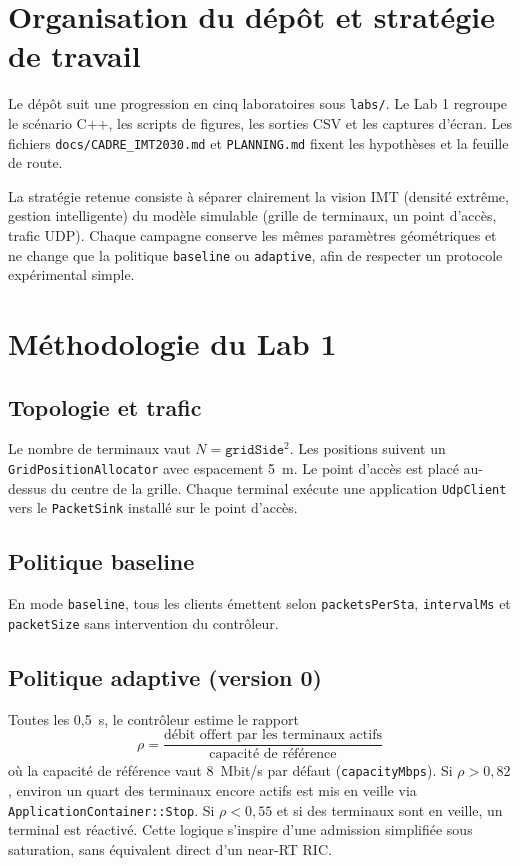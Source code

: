\documentclass[11pt,a4paper]{article}
\begin{document}
\section{Organisation du dépôt et stratégie de travail}

Le dépôt suit une progression en cinq laboratoires sous \texttt{labs/}. Le Lab 1 regroupe le scénario C++, les scripts de figures, les sorties CSV et les captures d'écran. Les fichiers \texttt{docs/CADRE\_IMT2030.md} et \texttt{PLANNING.md} fixent les hypothèses et la feuille de route.

La stratégie retenue consiste à séparer clairement la vision IMT (densité extrême, gestion intelligente) du modèle simulable (grille de terminaux, un point d'accès, trafic UDP). Chaque campagne conserve les mêmes paramètres géométriques et ne change que la politique \texttt{baseline} ou \texttt{adaptive}, afin de respecter un protocole expérimental simple.

\section{Méthodologie du Lab 1}

\subsection{Topologie et trafic}

Le nombre de terminaux vaut $N = \texttt{gridSide}^2$. Les positions suivent un \texttt{GridPositionAllocator} avec espacement 5~m. Le point d'accès est placé au-dessus du centre de la grille. Chaque terminal exécute une application \texttt{UdpClient} vers le \texttt{PacketSink} installé sur le point d'accès.

\subsection{Politique baseline}

En mode \texttt{baseline}, tous les clients émettent selon \texttt{packetsPerSta}, \texttt{intervalMs} et \texttt{packetSize} sans intervention du contrôleur.

\subsection{Politique adaptive (version 0)}

Toutes les 0,5~s, le contrôleur estime le rapport
\[
  \rho = \frac{\text{débit offert par les terminaux actifs}}{\text{capacité de référence}}
\]
où la capacité de référence vaut 8~Mbit/s par défaut (\texttt{capacityMbps}). Si $\rho > 0{,}82$, environ un quart des terminaux encore actifs est mis en veille via \texttt{ApplicationContainer::Stop}. Si $\rho < 0{,}55$ et si des terminaux sont en veille, un terminal est réactivé. Cette logique s'inspire d'une admission simplifiée sous saturation, sans équivalent direct d'un near-RT RIC.
\end{document}

